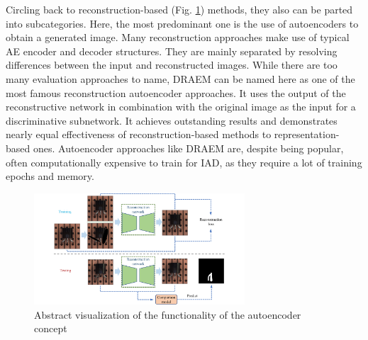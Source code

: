 Circling back to reconstruction-based (Fig. \ref{fig:autoencoderviz}) methods, they also can be parted into subcategories. Here, the most predominant one is the use of autoencoders to obtain a generated image. Many 
reconstruction approaches make use of typical AE encoder and decoder structures. They are mainly separated by resolving differences between the input and reconstructed images. 
While there are too many evaluation approaches to name, DRAEM \cite{Zavrtanik_2021DRAEM} can be named here as one of the most famous reconstruction autoencoder approaches. It uses 
the output of the reconstructive network in combination with the original image as the input for a discriminative subnetwork. It achieves outstanding results and demonstrates nearly equal effectiveness 
of reconstruction-based methods to representation-based ones. Autoencoder approaches like DRAEM are, despite being popular, often computationally expensive to train for IAD, as they require a lot of 
training epochs and memory.

\begin{figure}[H]
\centering
\includegraphics[width=0.7\textwidth]{figures/approachvizgeneral/autoencoderbiz.jpg}
\caption{Abstract visualization of the functionality of the autoencoder concept \cite{liu2024deep}}
\label{fig:autoencoderviz}
\end{figure}


